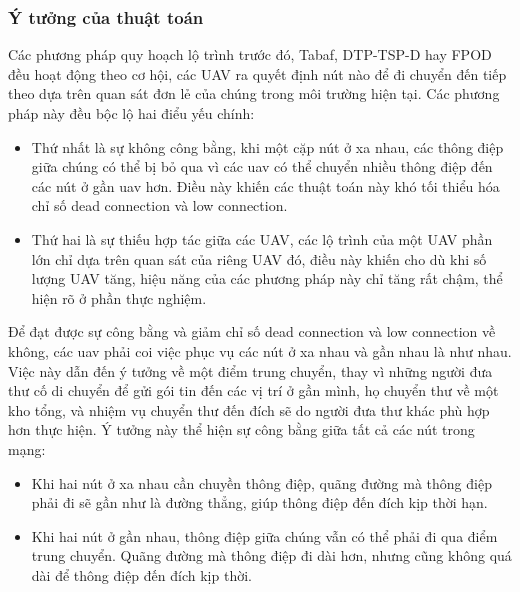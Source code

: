 \documentclass[a4paper]{article}
\begin{document}
\subsubsection{Ý tưởng của thuật toán}
Các phương pháp quy hoạch lộ trình trước đó, Tabaf, DTP-TSP-D hay FPOD đều hoạt động theo cơ hội, các UAV ra quyết định nút nào để đi chuyển đến tiếp theo dựa trên quan sát đơn lẻ của chúng trong môi trường hiện tại. Các phương pháp này đều bộc lộ hai điểu yếu chính:
\begin{itemize}
  \item Thứ nhất là sự không công bằng, khi một cặp nút ở xa nhau, các thông điệp giữa chúng có thể bị bỏ qua vì các uav có thể chuyển nhiều thông điệp đến các nút ở gần uav hơn. Điều này khiến các thuật toán này khó tối thiểu hóa chỉ số dead connection và low connection.
  \item Thứ hai là sự thiếu hợp tác giữa các UAV, các lộ trình của một UAV phần lớn chỉ dựa trên quan sát của riêng UAV đó, điều này khiến cho dù khi số lượng UAV tăng, hiệu năng của các phương pháp này chỉ tăng rất chậm, thể hiện rõ ở phần thực nghiệm.
\end{itemize}

Để đạt được sự công bằng và giảm chỉ số dead connection và low connection về không, các uav phải coi việc phục vụ các nút ở xa nhau và gần nhau là như nhau. Việc này dẫn đến ý tưởng về một điểm trung chuyển, thay vì những người đưa thư cố di chuyển để gửi gói tin đến các vị trí ở gần mình, họ chuyển thư về một kho tổng, và nhiệm vụ chuyển thư đến đích sẽ do người đưa thư khác phù hợp hơn thực hiện. Ý tưởng này thể hiện sự công bằng giữa tất cả các nút trong mạng:
\begin{itemize}
  \item Khi hai nút ở xa nhau cần chuyền thông điệp, quãng đường mà thông điệp phải đi sẽ gần như là đường thẳng, giúp thông điệp đến đích kịp thời hạn.
  \item Khi hai nút ở gần nhau, thông điệp giữa chúng vẫn có thể phải đi qua điểm trung chuyển. Quãng đường mà thông điệp đi dài hơn, nhưng cũng không quá dài để thông điệp đến đích kịp thời.
\end{itemize}
\end{document}
